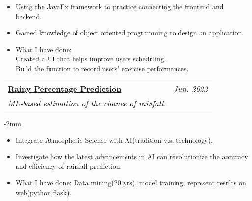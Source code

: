 \documentclass[a4paper,11pt]{article}
\makeatletter
\newcommand{\resumeProject}[4]{
\vspace{0.5mm}\item
    \begin{tabular*}{0.98\textwidth}[t]{l@{\extracolsep{\fill}}r}
        \textbf{#1} & \textit{\footnotesize{#3}} \\
        \footnotesize{\textit{#2}} & \footnotesize{#4}
    \end{tabular*}
    \vspace{-2.4mm}
}
\newcommand{\resumeItemListStart}{\begin{justify}\begin{itemize}[leftmargin=3ex, rightmargin=2ex, noitemsep,labelsep=1.2mm,itemsep=0mm]\small}
\newcommand{\resumeItemListEnd}{\end{itemize}\end{justify}\vspace{-2mm}}
\makeatother
\begin{document}
        \vspace{-2mm}
      
      \resumeItemListStart
        \item {Using the JavaFx framework to practice connecting the frontend and backend.}
        \item {Gained knowledge of object oriented programming to design an application.}
        \item {What I have done: \\
        Created a UI that helps improve users scheduling.\\
        Build the function to record users' exercise performances.}
    \resumeItemListEnd
    \vspace{-3mm}
    
    \resumeProject
      {\href{https://github.com/1chooo/rain_prediction}{ Rainy Percentage Prediction}} %
      {ML-based estimation of the chance of rainfall.} %
      {Jun. 2022} %

        \vspace{-2mm}
        
      \resumeItemListStart
      \item {Integrate Atmospheric Science with AI(tradition v.s. technology).}
      \item {Investigate how the latest advancements in AI can revolutionize the accuracy and efficiency of rainfall prediction.}
      \item {What I have done: Data mining(20 yrs), model training, represent results on web(python flask).}
    \resumeItemListEnd
    \vspace{-3mm}



\end{document}
